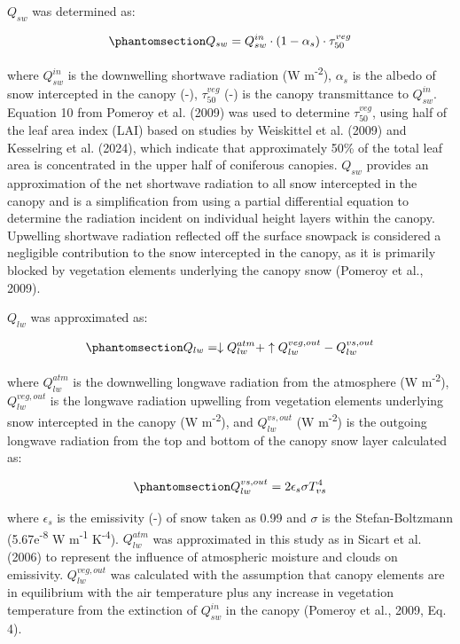 \documentclass[
]{agujournal2019}
\begin{document}
\(Q_{sw}\) was determined as:

\begin{equation}\phantomsection\label{eq-sw}{
Q_{sw} = Q_{sw}^{in} \cdot (1 - \alpha_s) \cdot \tau_{50}^{veg}
}\end{equation}

where \(Q_{sw}^{in}\) is the downwelling shortwave radiation (W
m\textsuperscript{-2}), \(\alpha_s\) is the albedo of snow intercepted
in the canopy (-), \(\tau_{50}^{veg}\) (-) is the canopy transmittance
to \(Q_{sw}^{in}\). Equation 10 from Pomeroy et al. (2009) was used to
determine \(\tau_{50}^{veg}\), using half of the leaf area index (LAI)
based on studies by Weiskittel et al. (2009) and Kesselring et al.
(2024), which indicate that approximately 50\% of the total leaf area is
concentrated in the upper half of coniferous canopies. \(Q_{sw}\)
provides an approximation of the net shortwave radiation to all snow
intercepted in the canopy and is a simplification from using a partial
differential equation to determine the radiation incident on individual
height layers within the canopy. Upwelling shortwave radiation reflected
off the surface snowpack is considered a negligible contribution to the
snow intercepted in the canopy, as it is primarily blocked by vegetation
elements underlying the canopy snow (Pomeroy et al., 2009).

\(Q_{lw}\) was approximated as:

\begin{equation}\phantomsection\label{eq-lw}{
Q_{lw} = \downarrow Q_{lw}^{atm} + \uparrow Q_{lw}^{veg, out} - Q_{lw}^{vs, out}
}\end{equation}

where \(Q_{lw}^{atm}\) is the downwelling longwave radiation from the
atmosphere (W m\textsuperscript{-2}), \(Q_{lw}^{veg, out}\) is the
longwave radiation upwelling from vegetation elements underlying snow
intercepted in the canopy (W m\textsuperscript{-2}), and
\(Q_{lw}^{vs, out}\) (W m\textsuperscript{-2}) is the outgoing longwave
radiation from the top and bottom of the canopy snow layer calculated
as:

\begin{equation}\phantomsection\label{eq-lw-vs}{
Q_{lw}^{vs, out} = 2 \epsilon_{s} \sigma T_{vs}^4
}\end{equation}

where \(\epsilon_s\) is the emissivity (-) of snow taken as 0.99 and
\(\sigma\) is the Stefan-Boltzmann (5.67e\textsuperscript{-8} W
m\textsuperscript{-1} K\textsuperscript{-4}). \(Q_{lw}^{atm}\) was
approximated in this study as in Sicart et al. (2006) to represent the
influence of atmospheric moisture and clouds on emissivity.
\(Q_{lw}^{veg, out}\) was calculated with the assumption that canopy
elements are in equilibrium with the air temperature plus any increase
in vegetation temperature from the extinction of \(Q_{sw}^{in}\) in the
canopy (Pomeroy et al., 2009, Eq. 4).
\end{document}
